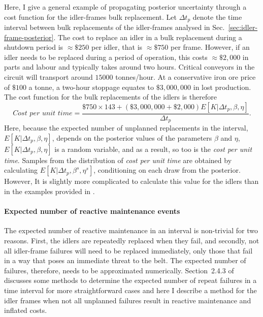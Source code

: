 Here, I give a general example of propagating posterior uncertainty through a cost function for the idler-frames bulk replacement. Let $\Delta t_p$ denote the time interval between bulk replacements of the idler-frames analysed in Sec.~\ref{sec:idler-frame-posterior}. The cost to replace an idler in a bulk replacement during a shutdown period is $\approx\$250$ per idler, that is $\approx\$750$ per frame. However, if an idler needs to be replaced during a period of operation, this costs $\approx\$2,000$ in parts and labour and typically takes around two hours. Critical conveyors in the circuit will transport around $15000$ tonnes/hour. At a conservative iron ore price of $\$100$ a tonne, a two-hour stoppage equates to $\$3,000,000$ in lost production. The cost function for the bulk replacements of the idlers is therefore
\begin{equation*}
 \textit{Cost per unit time} = \frac{\$750 \times 143 + (\$3,000,000 + \$2,000) E[K|\Delta t_p,\beta,\eta]}{\Delta t_p}.
\end{equation*}
Here, because the expected number of unplanned replacements in the interval, $E[K|\Delta t_p,\beta,\eta]$, depends on the posterior values of the parameters $\beta$ and $\eta$, $E[K|\Delta t_p,\beta,\eta]$ is a random variable, and as a result, so too is the \textit{cost per unit time}. Samples from the distribution of \textit{cost per unit time} are obtained by calculating $E[K|\Delta t_p,\beta^s,\eta^s]$, conditioning on each draw from the posterior. However, It is slightly more complicated to calculate this value for the idlers than in the examples provided in \citet{jardine2013}.

\paragraph*{Expected number of reactive maintenance events}

The expected number of reactive maintenance in an interval is non-trivial for two reasons. First, the idlers are repeatedly replaced when they fail, and secondly, not all idler-frame failures will need to be replaced immediately, only those that fail in a way that poses an immediate threat to the belt. The expected number of failures, therefore, needs to be approximated numerically. Section~2.4.3 of \citet{jardine2013} discusses some methods to determine the expected number of repeat failures in a time interval for more straightforward cases and here I describe a method for the idler frames when not all unplanned failures result in reactive maintenance and inflated costs.

